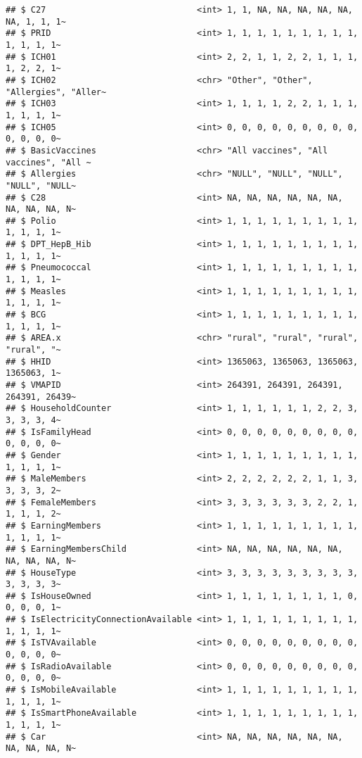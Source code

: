 \documentclass[
]{article}
\begin{document}
\begin{verbatim}
## $ C27                              <int> 1, 1, NA, NA, NA, NA, NA, NA, 1, 1, 1~
## $ PRID                             <int> 1, 1, 1, 1, 1, 1, 1, 1, 1, 1, 1, 1, 1~
## $ ICH01                            <int> 2, 2, 1, 1, 2, 2, 1, 1, 1, 1, 2, 2, 1~
## $ ICH02                            <chr> "Other", "Other", "Allergies", "Aller~
## $ ICH03                            <int> 1, 1, 1, 1, 2, 2, 1, 1, 1, 1, 1, 1, 1~
## $ ICH05                            <int> 0, 0, 0, 0, 0, 0, 0, 0, 0, 0, 0, 0, 0~
## $ BasicVaccines                    <chr> "All vaccines", "All vaccines", "All ~
## $ Allergies                        <chr> "NULL", "NULL", "NULL", "NULL", "NULL~
## $ C28                              <int> NA, NA, NA, NA, NA, NA, NA, NA, NA, N~
## $ Polio                            <int> 1, 1, 1, 1, 1, 1, 1, 1, 1, 1, 1, 1, 1~
## $ DPT_HepB_Hib                     <int> 1, 1, 1, 1, 1, 1, 1, 1, 1, 1, 1, 1, 1~
## $ Pneumococcal                     <int> 1, 1, 1, 1, 1, 1, 1, 1, 1, 1, 1, 1, 1~
## $ Measles                          <int> 1, 1, 1, 1, 1, 1, 1, 1, 1, 1, 1, 1, 1~
## $ BCG                              <int> 1, 1, 1, 1, 1, 1, 1, 1, 1, 1, 1, 1, 1~
## $ AREA.x                           <chr> "rural", "rural", "rural", "rural", "~
## $ HHID                             <int> 1365063, 1365063, 1365063, 1365063, 1~
## $ VMAPID                           <int> 264391, 264391, 264391, 264391, 26439~
## $ HouseholdCounter                 <int> 1, 1, 1, 1, 1, 1, 2, 2, 3, 3, 3, 3, 4~
## $ IsFamilyHead                     <int> 0, 0, 0, 0, 0, 0, 0, 0, 0, 0, 0, 0, 0~
## $ Gender                           <int> 1, 1, 1, 1, 1, 1, 1, 1, 1, 1, 1, 1, 1~
## $ MaleMembers                      <int> 2, 2, 2, 2, 2, 2, 1, 1, 3, 3, 3, 3, 2~
## $ FemaleMembers                    <int> 3, 3, 3, 3, 3, 3, 2, 2, 1, 1, 1, 1, 2~
## $ EarningMembers                   <int> 1, 1, 1, 1, 1, 1, 1, 1, 1, 1, 1, 1, 1~
## $ EarningMembersChild              <int> NA, NA, NA, NA, NA, NA, NA, NA, NA, N~
## $ HouseType                        <int> 3, 3, 3, 3, 3, 3, 3, 3, 3, 3, 3, 3, 3~
## $ IsHouseOwned                     <int> 1, 1, 1, 1, 1, 1, 1, 1, 0, 0, 0, 0, 1~
## $ IsElectricityConnectionAvailable <int> 1, 1, 1, 1, 1, 1, 1, 1, 1, 1, 1, 1, 1~
## $ IsTVAvailable                    <int> 0, 0, 0, 0, 0, 0, 0, 0, 0, 0, 0, 0, 0~
## $ IsRadioAvailable                 <int> 0, 0, 0, 0, 0, 0, 0, 0, 0, 0, 0, 0, 0~
## $ IsMobileAvailable                <int> 1, 1, 1, 1, 1, 1, 1, 1, 1, 1, 1, 1, 1~
## $ IsSmartPhoneAvailable            <int> 1, 1, 1, 1, 1, 1, 1, 1, 1, 1, 1, 1, 1~
## $ Car                              <int> NA, NA, NA, NA, NA, NA, NA, NA, NA, N~

\end{verbatim}
\end{document}
